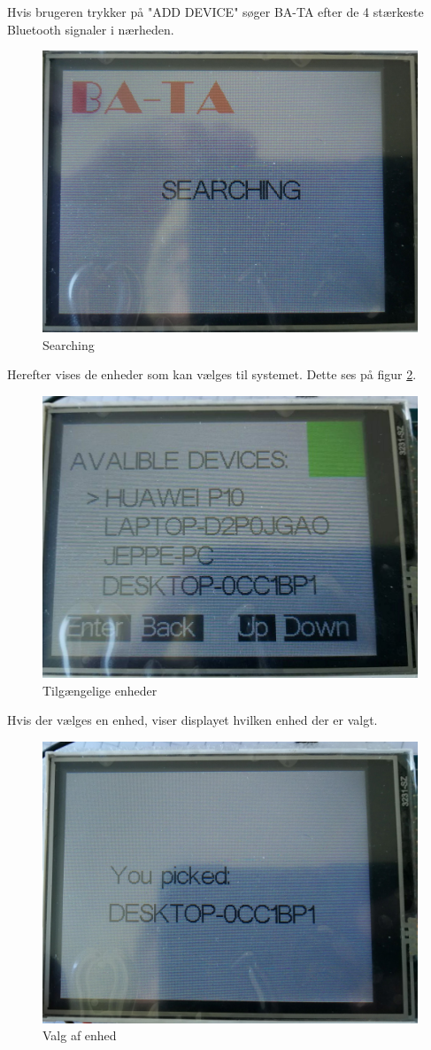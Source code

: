Hvis brugeren trykker på "ADD DEVICE" søger BA-TA efter de 4 stærkeste Bluetooth signaler i nærheden. 
\begin{figure}[H]
	\centering
	\includegraphics[width = 300 pt]{Img/Searching.jpg}
	\caption{Searching}
	\label{fig:Searching}
\end{figure}
Herefter vises de enheder som kan vælges til systemet. Dette ses på figur \ref{fig:devices}.
\begin{figure}[H]
	\centering
	\includegraphics[width = 300 pt]{Img/devices.jpg}
	\caption{Tilgængelige enheder}
	\label{fig:devices}
\end{figure}
Hvis der vælges en enhed, viser displayet hvilken enhed der er valgt. 
\begin{figure}[H]
	\centering
	\includegraphics[width = 300 pt]{Img/pick.jpg}
	\caption{Valg af enhed}
	\label{fig:pick}
\end{figure}
